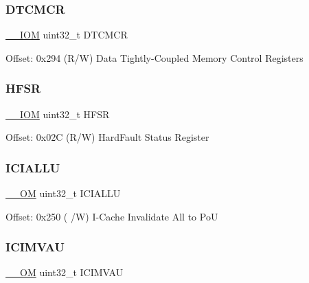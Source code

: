 \subsubsection{\texorpdfstring{D\+T\+C\+M\+CR}{DTCMCR}}
{\footnotesize\ttfamily \mbox{\hyperlink{core__cm4_8h_ab6caba5853a60a17e8e04499b52bf691}{\+\_\+\+\_\+\+I\+OM}} uint32\+\_\+t D\+T\+C\+M\+CR}

Offset\+: 0x294 (R/W) Data Tightly-\/\+Coupled Memory Control Registers \mbox{\label{struct_s_c_b___type_ab974e7ceb2e52a3fbcaa84e06e52922d}} 
\subsubsection{\texorpdfstring{H\+F\+SR}{HFSR}}
{\footnotesize\ttfamily \mbox{\hyperlink{core__cm4_8h_ab6caba5853a60a17e8e04499b52bf691}{\+\_\+\+\_\+\+I\+OM}} uint32\+\_\+t H\+F\+SR}

Offset\+: 0x02C (R/W) Hard\+Fault Status Register \mbox{\label{struct_s_c_b___type_a011024c365e7c5bd13a63830af60b10c}} 
\subsubsection{\texorpdfstring{I\+C\+I\+A\+L\+LU}{ICIALLU}}
{\footnotesize\ttfamily \mbox{\hyperlink{core__cm4_8h_a0ea2009ed8fd9ef35b48708280fdb758}{\+\_\+\+\_\+\+OM}} uint32\+\_\+t I\+C\+I\+A\+L\+LU}

Offset\+: 0x250 ( /W) I-\/\+Cache Invalidate All to PoU \mbox{\label{struct_s_c_b___type_a1a8ecda7b1e4a1100dd82fc694bb4eb5}} 
\subsubsection{\texorpdfstring{I\+C\+I\+M\+V\+AU}{ICIMVAU}}
{\footnotesize\ttfamily \mbox{\hyperlink{core__cm4_8h_a0ea2009ed8fd9ef35b48708280fdb758}{\+\_\+\+\_\+\+OM}} uint32\+\_\+t I\+C\+I\+M\+V\+AU}

